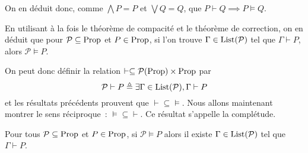 On en déduit donc, comme $\bigwedge P = P$ et $\bigvee Q = Q$, que
$P\vdash Q \implies P \vDash Q$.

\begin{remark}
  En utilisant à la fois le théorème de compacité et le théorème de correction,
  on en déduit que pour $\mathcal P\subseteq \operatorname{Prop}$ et $P\in \operatorname{Prop}$, si l'on
  trouve $\Gamma\in\operatorname{List}(\mathcal P)$ tel que $\Gamma\vdash P$, alors
  $\mathcal P \vDash P$.

  On peut donc définir la relation
  $\vdash \subseteq \mathcal{P}(\operatorname{Prop})\times \operatorname{Prop}$ par
  \[\mathcal P\vdash P \triangleq \exists \Gamma\in\operatorname{List}(\mathcal P),
  \Gamma\vdash P\]
  et les résultats précédents prouvent que $\vdash\subseteq\vDash$. Nous allons
  maintenant montrer le sens réciproque~: $\vDash\subseteq\vdash$. Ce résultat
  s'appelle la complétude.
\end{remark}

\begin{theorem}
  Pour tous $\mathcal P\subseteq \operatorname{Prop}$ et $P\in \operatorname{Prop}$, si $\mathcal P\vDash P$
  alors il existe $\Gamma\in\operatorname{List}(\mathcal P)$ tel que $\Gamma\vdash P$.
\end{theorem}

